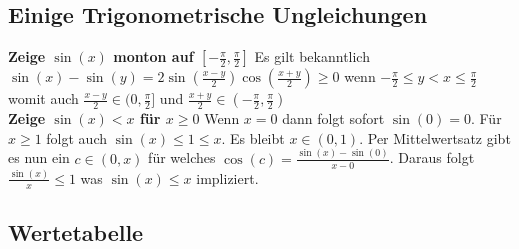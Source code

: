 \documentclass[25pt]{sciposter}
\begin{document}
\begin{multicols}{3}
\subsection*{Einige Trigonometrische Ungleichungen}

\textbf{Zeige $\sin(x)$ monton auf $[-\frac{\pi}{2}, \frac{\pi}{2}]$} Es gilt bekanntlich $\sin(x) - \sin(y) =  2 \sin \left(\frac{x-y}{2}\right) \cos \left(\frac{x+y}{2}\right) \geq 0$ wenn $-\frac{\pi}{2} \leq y < x \leq \frac{\pi}{2}$ womit auch $\frac{x-y}{2} \in (0,\frac{\pi}{2}]$ und $\frac{x+y}{2} \in (- \frac{\pi}{2}, \frac{\pi}{2})$\\


\textbf{Zeige $\sin(x) < x$ für $x \geq 0$}
Wenn $x = 0$ dann folgt sofort $\sin(0) = 0$. Für $x\geq 1$ folgt auch $\sin(x) \leq 1 \leq x$. Es bleibt $x \in (0,1)$. Per Mittelwertsatz gibt es nun ein $c \in (0,x)$ für welches $\cos(c) = \frac{\sin(x) - \sin(0)}{x - 0}$. Daraus folgt $\frac{\sin(x)}{x} \leq 1$ was $\sin(x) \leq x$ impliziert.



\subsection*{Wertetabelle}




\end{multicols}
\end{document}
